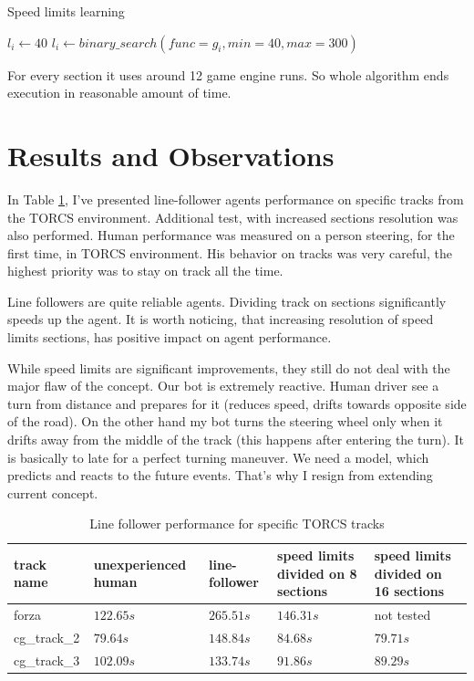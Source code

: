 \documentclass[declaration,shortabstract,english,inz]{iithesis}
\begin{document}
\begin{algorithm}
    \caption{Speed limits learning}
    \label{alg:speed_limits}
    \begin{algorithmic}
            \STATE $l_i \gets 40$
        \ENDFOR
            \STATE $l_i \gets binary\_search(func=g_i, min=40, max=300)$
        \ENDFOR
    \end{algorithmic}
\end{algorithm}


For every section it uses around 12 game engine runs.
So whole algorithm ends execution in reasonable amount of time.

\section{Results and Observations}

In Table \ref{tab:line_follower}, I've presented line-follower agents performance on specific tracks from the TORCS environment. Additional test, with increased sections resolution was also performed. Human performance was measured on a person steering, for the first time, in TORCS environment. His behavior on tracks was very careful, the highest priority was to stay on track all the time.

Line followers are quite reliable agents.
Dividing track on sections significantly speeds up the agent.
It is worth noticing, that increasing resolution of speed limits sections, has positive impact on agent performance.


While speed limits are significant improvements, they still do not deal with the major flaw of the concept.
Our bot is extremely reactive.
Human driver see a turn from distance and prepares for it (reduces speed, drifts towards opposite side of the road).
On the other hand my bot turns the steering wheel only when it drifts away from the middle of the track (this happens after entering the turn).
It is basically to late for a perfect turning maneuver.
We need a model, which predicts and reacts to the  future events.
That's why I resign from extending current concept.


\begin{table}[h]
    \centering
    \begin{tabular}{ |p{1.7cm}|p{2.5cm}|p{2cm}|p{2.4cm}|p{2.4cm}|}
          \hline
          track name & unexperienced human & line-follower & speed limits divided on 8 sections & speed limits divided on 16 sections  \\
          \hline
          forza &  $122.65s$ & $265.51s$ & $146.31s$ & not tested  \\
          \hline
          cg\_track\_2 & $79.64s$ & $148.84s$ &  $84.68s$ & $79.71s$ \\ 

          \hline
          cg\_track\_3 & $102.09s$ & $133.74s$ & $91.86s$  & $89.29s$  \\
          \hline
    \end{tabular}
        \caption{Line follower performance for specific TORCS tracks}
        \label{tab:line_follower}

\end{table}
\end{document}
